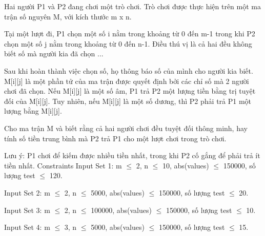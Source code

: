 Hai người P1 và P2 đang chơi một trò chơi. Trò chơi được thực hiện trên một ma trận số nguyên M, với kích thước m x n.  

   Tại một lượt đi, P1 chọn một số i nằm trong khoảng từ 0 đến m-1 trong khi P2 chọn một số j nằm trong khoảng từ 0 đến n-1. Điều thú vị là cả hai đều không biết số mà người kia đã chọn ...  

   Sau khi hoàn thành việc chọn số, họ thông báo số của mình cho người kia biết. M[i][j] là một phần tử của ma trận được quyết định bởi các chỉ số mà 2 người chơi đã chọn. Nếu M[i][j] là một số âm, P1 trả P2 một lượng tiền bằng trị tuyệt đối của M[i][j]. Tuy nhiên, nếu M[i][j] là một số dương, thì P2 phải trả P1 một lượng bằng M[i][j].  

   Cho ma trận M và biết rằng cả hai người chơi đều tuyệt đối thông minh, hay tính số tiền trung bình mà P2 trả P1 cho một lượt chơi trong trò chơi.  

   Lưu ý: P1 chơi để kiếm được nhiều tiền nhất, trong khi P2 cố gắng để phải trả ít tiền nhất.
   Constraints  
Input Set 1: m  $\le$  2, n  $\le$  10, abs(values)  $\le$  150000, số lượng test  $\le$  120.  

   Input Set 2: m  $\le$  2, n  $\le$  5000, abs(values)  $\le$  150000, số lượng test  $\le$  20.  

   Input Set 3: m  $\le$  2, n  $\le$  100000, abs(values)  $\le$  150000, số lượng test  $\le$  10.  

   Input Set 4: m  $\le$  3, n  $\le$  5000, abs(values)  $\le$  150000, số lượng test  $\le$  15.